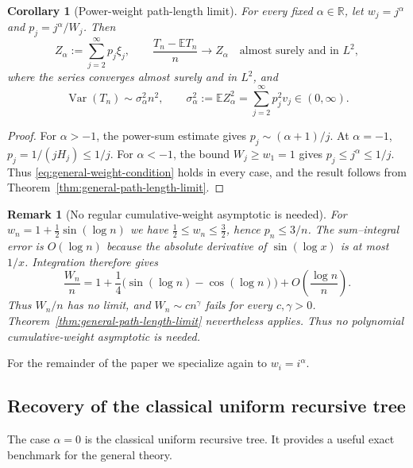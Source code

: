 \documentclass[11pt,a4paper]{article}
\newtheorem{corollary}[theorem]{Corollary}
\newtheorem{remark}[theorem]{Remark}
\newcommand{\E}{\mathbb{E}}
\newcommand{\1}{\mathbf{1}}
\begin{document}
\begin{corollary}[Power-weight path-length limit]
\label{cor:power-path-length-limit}
For every fixed $\alpha\in\mathbb R$, let $w_j=j^\alpha$ and
$p_j=j^\alpha/W_j$.  Then
\begin{equation}
  Z_\alpha:=\sum_{j=2}^{\infty}p_j\xi_j,
  \qquad
  \frac{T_n-\E T_n}{n}\longrightarrow Z_\alpha
  \quad\text{almost surely and in }L^2,
  \label{eq:power-path-length-limit}
\end{equation}
where the series converges almost surely and in $L^2$, and
\begin{equation}
  \operatorname{Var}(T_n)\sim\sigma_\alpha^2n^2,
  \qquad
  \sigma_\alpha^2:=\E Z_\alpha^2
    =\sum_{j=2}^{\infty}p_j^2v_j\in(0,\infty).
  \label{eq:power-variance-limit}
\end{equation}
\end{corollary}

\begin{proof}
For $\alpha>-1$, the power-sum estimate gives
$p_j\sim(\alpha+1)/j$.  At $\alpha=-1$,
$p_j=1/(jH_j)\le1/j$.  For $\alpha<-1$, the bound $W_j\ge w_1=1$
gives $p_j\le j^\alpha\le1/j$.  Thus
\eqref{eq:general-weight-condition} holds in every case, and the result
follows from Theorem~\ref{thm:general-path-length-limit}.
\end{proof}


\begin{remark}[No regular cumulative-weight asymptotic is needed]
For $w_n=1+\frac12\sin(\log n)$ we have $\frac12\le w_n\le\frac32$, hence $p_n\le3/n$.
The sum--integral error is $O(\log n)$ because the absolute derivative of $\sin(\log x)$ is at most $1/x$.
Integration therefore gives
\[
\frac{W_n}{n}=1+\frac14\bigl(\sin(\log n)-\cos(\log n)\bigr)
+O\!\left(\frac{\log n}{n}\right).
\]
Thus $W_n/n$ has no limit, and $W_n\sim c n^\gamma$ fails for every $c,\gamma>0$.
Theorem~\ref{thm:general-path-length-limit} nevertheless applies.
Thus no polynomial cumulative-weight asymptotic is needed.
\end{remark}

For the remainder of the paper we specialize again to $w_i=i^\alpha$.

\subsection{Recovery of the classical uniform recursive tree}
\label{subsec:uniform}

The case $\alpha=0$ is the classical uniform recursive tree.  It provides a
useful exact benchmark for the general theory.
\end{document}
